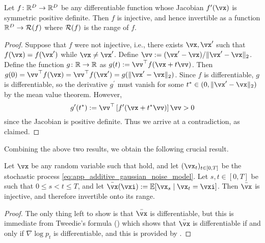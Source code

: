 \documentclass[../../book-main.tex]{subfiles}
\begin{document}
\begin{lemma}\label{lem:gribonval_A2}
    Let \(f \colon \mathbb{R}^{D} \to \mathbb{R}^{D}\) be any differentiable function whose Jacobian \(f^{\prime}(\vx)\) is symmetric positive definite. Then \(f\) is injective, and hence invertible as a function \(\mathbb{R}^{D} \to \mathcal{R}(f)\) where \(\mathcal{R}(f)\) is the range of \(f\).
\end{lemma}
\begin{proof}
    Suppose that \(f\) were not injective, i.e., there exists \(\vx, \vx^{\prime}\) such that \(f(\vx) = f(\vx^{\prime})\) while \(\vx \neq \vx^{\prime}\). Define \(\vv := (\vx^{\prime} - \vx)/\norm{\vx^{\prime} - \vx}_{2}\). Define the function \(g \colon \mathbb{R} \to \mathbb{R}\) as \(g(t) := \vv^{\top}f(\vx + t\vv)\). Then \(g(0) = \vv^{\top}f(\vx) = \vv^{\top}f(\vx^{\prime}) = g(\norm{\vx^{\prime} - \vx}_{2})\). Since \(f\) is differentiable, \(g\) is differentiable, so the derivative  \(g^{\prime}\) must vanish for some \(t^{\ast} \in (0, \norm{\vx^{\prime} - \vx}_{2})\) by the mean value theorem. However,
    \begin{equation}
        g^{\prime}(t^{\ast}) := \vv^{\top}\bs{f^{\prime}(\vx + t^{\ast}\vv)}\vv > 0
    \end{equation}
    since the Jacobian is positive definite. Thus we arrive at a contradiction, as claimed.
\end{proof}

Combining the above two results, we obtain the following crucial result.

\begin{corollary}\label{cor:gribonval_A2}
    Let \(\vx\) be any random variable such that  hold, and let \((\vx_{t})_{t \in [0, T]}\) be the stochastic process \eqref{eq:app_additive_gaussian_noise_model}. Let \(s, t \in [0, T]\) be such that \(0 \leq s < t \leq T\), and let \(\bar{\vx}(\vxi) := \Ex[\vx_{s} \mid \vx_{t} = \vxi]\). Then \(\bar{\vx}\) is injective, and therefore invertible onto its range.
\end{corollary}
\begin{proof}
    The only thing left to show is that \(\bar{\vx}\) is differentiable,  but this is immediate from Tweedie's formula () which shows that \(\bar{\vx}\) is differentiable if and only if \(\nabla \log p_{t}\) is differentiable, and this is provided by .
\end{proof}
\end{document}
